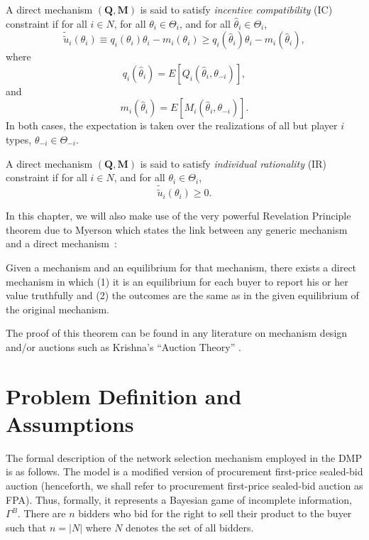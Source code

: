 A direct mechanism $(\mathbf{Q},\mathbf{M})$ is said to satisfy \emph{incentive compatibility} (IC) constraint if for all $i\in N$, for all $\theta_i\in\Theta_i$, and for all $\hat{\theta}_i\in\Theta_i$,
\begin{equation*}
  \tilde{\tilde{u}}_i(\theta_i) \equiv q_i(\theta_i)\theta_i - m_i(\theta_i)\ge q_i(\hat{\theta}_i)\theta_i - m_i(\hat{\theta}_i),
\end{equation*}
where
\begin{equation*}
  q_i(\hat{\theta}_i) = E[Q_i(\hat{\theta}_i,\theta_{-i})],
\end{equation*}
and
\begin{equation*}
  m_i(\hat{\theta}_i) = E[M_i(\hat{\theta}_i, \theta_{-i})].
\end{equation*}
In both cases, the expectation is taken over the realizations of all but player $i$ types, $\theta_{-i}\in\Theta_{-i}$.

A direct mechanism $(\mathbf{Q}, \mathbf{M})$ is said to satisfy \emph{individual rationality} (IR) constraint if for all $i\in N$, and for all $\theta_i\in\Theta_i$,
\begin{equation*}
  \tilde{\tilde{u}}_i(\theta_i)\ge 0.
\end{equation*}

In this chapter, we will also make use of the very powerful Revelation Principle theorem due to Myerson which states the link between any generic mechanism and a direct mechanism~\cite{Myerson1979, Krishna10}:
\begin{thm}
\label{thm:revelation_principle}
Given a mechanism and an equilibrium for that mechanism, there exists a direct mechanism in which (1) it is an equilibrium for each buyer to report his or her value truthfully and (2) the outcomes are the same as in the given equilibrium of the original mechanism.
\end{thm}
\noindent The proof of this theorem can be found in any literature on mechanism design and/or auctions such as Krishna's ``Auction Theory'' \cite{Krishna10}.

\section{Problem Definition and Assumptions} %
\label{sec:problem_definition_and_assumptions}
The formal description of the network selection mechanism employed in the DMP is as follows. The model is a modified version of procurement first-price sealed-bid auction (henceforth, we shall refer to procurement first-price sealed-bid auction as FPA). Thus, formally, it represents a Bayesian game of incomplete information, $\Gamma^B$. There are $n$ bidders who bid for the right to sell their product to the buyer such that $n = |N|$ where $N$ denotes the set of all bidders.

